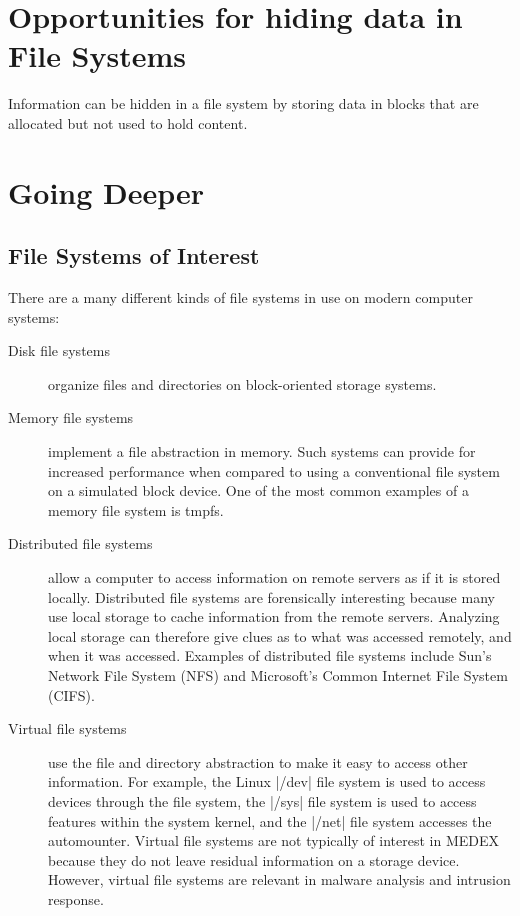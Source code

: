 \section{Opportunities for hiding data in File Systems}

Information can be hidden in a file system by storing data in blocks
that are allocated but not used to hold content\cite{dfrws2005:KnutEcksteinAndMarkoJahnke}. 

\section{Going Deeper}
\subsection{File Systems of Interest}
There are a many different kinds of file systems in use on
modern computer systems:
\begin{description}
\item[Disk file systems] organize files and directories on
  block-oriented storage systems. 
\item[Memory file systems] implement a file abstraction in
  memory. Such systems can provide for increased performance when
  compared to using a conventional file system on a simulated block
  device. One of the most common examples of a memory file system is tmpfs\cite{Snyder90tmpfs:a}.
\item[Distributed file systems] allow a computer to access
  information on remote servers as if it is stored
  locally. Distributed file systems are forensically interesting
  because many use local storage to cache information from the remote
  servers. Analyzing local storage can therefore give clues as to what
  was accessed remotely, and when it was accessed. Examples of
  distributed file systems include Sun's Network File System
  (NFS)\cite{Sandberg85designand,Pawlowski00thenfs} and Microsoft's
  Common Internet File System (CIFS)\cite{ms-cifs}.
\item[Virtual file systems] use the file and directory abstraction to
  make it easy to access other information. For example, the Linux
  |/dev| file system is used to access devices through the file
  system, the |/sys| file system is used to access features within
  the system kernel, and the |/net| file system accesses the
  automounter. Virtual file systems are not typically of interest in
  MEDEX because they do not leave residual information on a storage
  device. However, virtual file systems are relevant in malware
  analysis and intrusion response.
\end{description}

